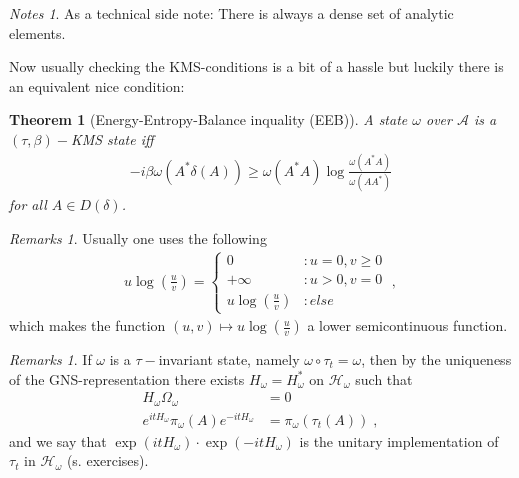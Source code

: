 \documentclass[
a4paper, %
11pt, %
onecolumn, %
openany, %
]{memoir}
\theoremstyle{definition}
\theoremstyle{remark}
\newtheorem{remarks}[definition]{Remarks}
\newtheorem{notes}[definition]{Notes}
\theoremstyle{plain}
\newtheorem{theorem}[definition]{Theorem}
\begin{document}
\begin{notes}
As a technical side note: There is always a dense set of analytic elements.
\end{notes}
Now usually checking the KMS-conditions is a bit of a hassle but luckily there is an equivalent nice condition: \begin{theorem}[Energy-Entropy-Balance inquality (EEB)]
	A state $\omega$ over $\mathcal{A}$ is a $(\tau,\beta)-$KMS state iff\begin{align} -i\beta\omega(A^*\delta(A))\geq \omega(A^*A)\log \frac{\omega(A^*A)}{\omega(AA^*)}\end{align}
	for all $A\in D(\delta)$.
\end{theorem}
\begin{remarks}
	Usually one uses the following \begin{align}
	u\log\left(\frac{u}{v}\right)=\begin{cases}
	0&\colon u=0, v\geq 0\\
	+\infty &\colon u> 0, v=0\\
	u\log\left(\frac{u}{v}\right)&\colon else
	\end{cases}\; ,
	\end{align}
	which makes the function $(u,v)\mapsto u\log\left(\frac{u}{v}\right)$ a lower semicontinuous function.
\end{remarks}
\begin{remarks}
	If $\omega$ is a $\tau-$invariant state, namely $\omega\circ \tau_t=\omega$, then by the uniqueness of the GNS-representation there exists $H_{\omega}=H_{\omega}^*$ on $\mathcal{H}_{\omega}$ such that \begin{align}
		H_{\omega}\Omega_{\omega}&=0\\
		e^{itH_{\omega}}\pi_{\omega}(A)e^{-itH_{\omega}}&=\pi_{\omega}(\tau_t(A))\;,
		\end{align}
		and we say that $\exp(itH_{\omega})\cdot \exp(-itH_{\omega})$ is the unitary implementation of $\tau_t$ in $\mathcal{H}_{\omega}$ (s. exercises). 
\end{remarks}		
\end{document}
